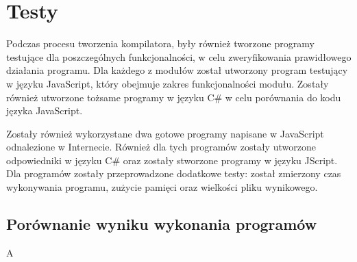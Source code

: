 \chapter{Testy}
\label{rozdzial4}

\par Podczas procesu tworzenia kompilatora, były również tworzone programy testujące dla poszczególnych funkcjonalności, w celu zweryfikowania prawidłowego działania programu. Dla każdego z modułów został utworzony program testujący w języku JavaScript, który obejmuje zakres funkcjonalności modułu. Zostały również utworzone tożsame programy w języku C\# w celu porównania do kodu języka JavaScript.
\par Zostały również wykorzystane dwa gotowe programy napisane w JavaScript odnalezione w Internecie. Również dla tych programów zostały utworzone odpowiedniki w języku C\# oraz zostały stworzone programy w języku JScript. Dla programów zostały przeprowadzone dodatkowe testy: został zmierzony czas wykonywania programu, zużycie pamięci oraz wielkości pliku wynikowego.

\section{Porównanie wyniku wykonania programów}

\par A




